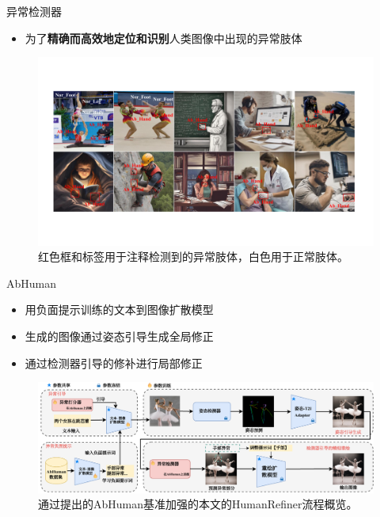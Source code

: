 \documentclass[
    fontset=fandol,
    xcolor=svgnames %
]{ctexbeamer}
\begin{document}
\begin{frame}

    \begin{alertblock}{异常检测器}
        \begin{itemize}
            \item 为了\textbf{精确而高效地定位和识别}人类图像中出现的异常肢体
        \end{itemize}
    \end{alertblock}
\begin{figure}
   
    \includegraphics[width=1\columnwidth]{fig/grid_images_resized.pdf}
    \caption{红色框和标签用于注释检测到的异常肢体，白色用于正常肢体。}
            \end{figure}
\end{frame}
\begin{frame}

    \begin{alertblock}{AbHuman}
        \begin{itemize}
            \item 用负面提示训练的文本到图像扩散模型
            \item 生成的图像通过姿态引导生成全局修正
            \item 通过检测器引导的修补进行局部修正
        \end{itemize}
    \end{alertblock}
\begin{figure}
    \includegraphics[width=1.0\linewidth]{fig/framework_v3.drawio.pdf}\vspace{-3mm}
    \caption{通过提出的AbHuman基准加强的本文的HumanRefiner流程概览。}
            \end{figure}
\end{frame}
\end{document}
